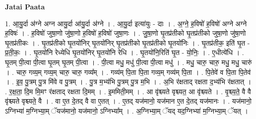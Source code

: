 \documentclass[17pt]{extarticle}
\begin{document}
\textbf{Jatai Paata} \newline

1. आ॒यु॒र्दा अ॑ग्ने अग्न आयु॒र्दा आ॑यु॒र्दा अ॑ग्ने । . आ॒यु॒र्दा इत्या॑युः - दाः । . अ॒ग्ने॒ ह॒विषो॑ ह॒विषो॑ अग्ने अग्ने ह॒विषः॑ । . ह॒विषो॑ जुषा॒णो जु॑षा॒णो ह॒विषो॑ ह॒विषो॑ जुषा॒णः । . जु॒षा॒णो घृ॒तप्र॑तीको घृ॒तप्र॑तीको जुषा॒णो जु॑षा॒णो घृ॒तप्र॑तीकः । . घृ॒तप्र॑तीको घृ॒तयो॑निर् घृ॒तयो॑निर् घृ॒तप्र॑तीको घृ॒तप्र॑तीको घृ॒तयो॑निः । . घृ॒तप्र॑तीक॒ इति॑ घृ॒त - प्र॒ती॒कः॒ । . घृ॒तयो॑नि रेध्येधि घृ॒तयो॑निर् घृ॒तयो॑नि रेधि । . घृ॒तयो॑नि॒रिति॑ घृ॒त - यो॒निः॒ । . ए॒धीत्ये॑धि । . घृ॒तम् पी॒त्वा पी॒त्वा घृ॒तम् घृ॒तम् पी॒त्वा । . पी॒त्वा मधु॒ मधु॑ पी॒त्वा पी॒त्वा मधु॑ । . मधु॒ चारु॒ चारु॒ मधु॒ मधु॒ चारु॑ । . चारु॒ गव्य॒म् गव्य॒म् चारु॒ चारु॒ गव्य᳚म् । . गव्य॑म् पि॒ता पि॒ता गव्य॒म् गव्य॑म् पि॒ता । . पि॒तेवे॑ व पि॒ता पि॒तेव॑ । . इ॒व॒ पु॒त्रम् पु॒त्र मि॑वे व पु॒त्रम् । . पु॒त्र म॒भ्य॑भि पु॒त्रम् पु॒त्र म॒भि । . अ॒भि र॑क्षताद् रक्षता द॒भ्य॑भि र॑क्षतात् । . र॒क्ष॒ता॒ दि॒म मि॒मꣳ र॑क्षताद् रक्षता दि॒मम् । . इ॒ममिती॒मम् । . आ वृ॑श्च्यते वृश्च्यत॒ आ वृ॑श्च्यते । . वृ॒श्च्य॒ते॒ वै वै वृ॑श्च्यते वृश्च्यते॒ वै । . वा ए॒त दे॒तद् वै वा ए॒तत् । . ए॒तद् यज॑मानो॒ यज॑मान ए॒त दे॒तद् यज॑मानः । . यज॑मानो॒ ऽग्निभ्या॑ म॒ग्निभ्या॒म् ॅयज॑मानो॒ यज॑मानो॒ ऽग्निभ्या᳚म् । . अ॒ग्निभ्या॒म् ॅयद् यद॒ग्निभ्या॑ म॒ग्निभ्या॒म् ॅयत् । \newline
\end{document}

